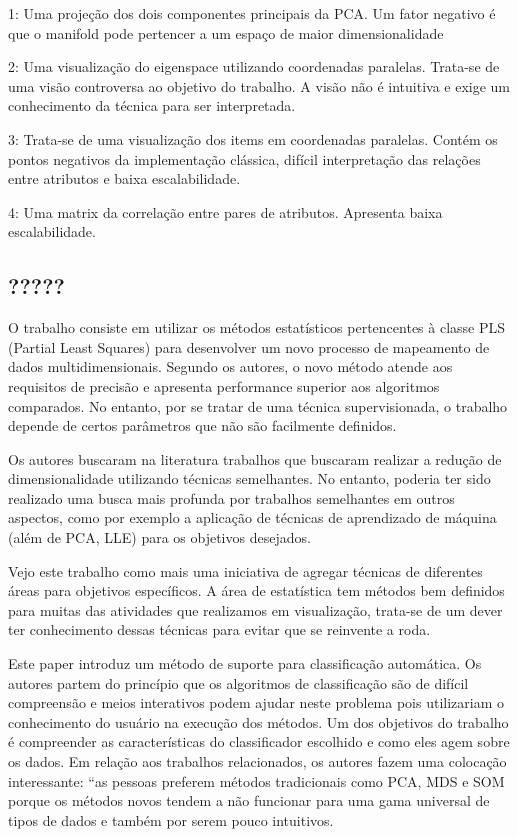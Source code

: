 1: Uma projeção dos dois componentes principais da PCA. Um fator negativo é que o manifold pode pertencer a um espaço de maior dimensionalidade

2: Uma visualização do eigenspace utilizando coordenadas paralelas. Trata-se de uma visão controversa ao objetivo do trabalho. A visão não é intuitiva e exige um conhecimento da técnica para ser interpretada.

3: Trata-se de uma visualização dos items em coordenadas paralelas. Contém os pontos negativos da implementação clássica, difícil interpretação das relações entre atributos e baixa escalabilidade.

4: Uma matrix da correlação entre pares de atributos. Apresenta baixa escalabilidade.

\subsection{?????}

O trabalho consiste em utilizar os métodos estatísticos pertencentes à classe PLS (Partial Least Squares) para desenvolver um novo processo de mapeamento de dados multidimensionais. Segundo os autores, o novo método atende aos requisitos de precisão e apresenta performance superior aos algoritmos comparados. No entanto, por se tratar de uma técnica supervisionada, o trabalho depende de certos parâmetros que não são facilmente definidos.

Os autores buscaram na literatura trabalhos que buscaram realizar a redução de dimensionalidade utilizando técnicas semelhantes. No entanto, poderia ter sido realizado uma busca mais profunda por trabalhos semelhantes em outros aspectos, como por exemplo a aplicação de técnicas de aprendizado de máquina (além de PCA, LLE) para os objetivos desejados.

Vejo este trabalho como mais uma iniciativa de agregar técnicas de diferentes áreas para objetivos específicos. A área de estatística tem métodos bem definidos para muitas das atividades que realizamos em visualização, trata-se de um dever ter conhecimento dessas técnicas para evitar que se reinvente a roda.

Este paper introduz um método de suporte para classificação automática. Os autores partem do princípio que os algoritmos de classificação são de difícil compreensão e meios interativos podem ajudar neste problema pois utilizariam o conhecimento do usuário na execução dos métodos.  Um dos objetivos do trabalho é compreender as características do classificador escolhido e como eles agem sobre os dados. Em relação aos trabalhos relacionados, os autores fazem uma colocação interessante: “as pessoas preferem métodos tradicionais como PCA, MDS e SOM porque os métodos novos tendem a não funcionar para uma gama universal de tipos de dados e também por serem pouco intuitivos.


